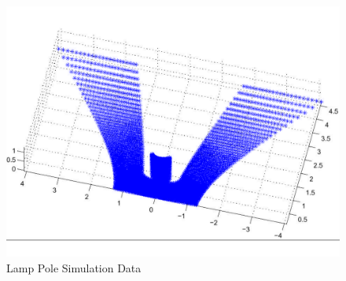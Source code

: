 \documentclass{cdcarta4}
\begin{document}
\begin{figure}[!htb]
    \centering
    \begin{minipage}[t]{0.4\textwidth}
       \centering\includegraphics[width=\textwidth]{img/PoleFit}
       \caption{Lamp Pole Simulation Data} \label{fig:polefit}
    \end{minipage}
\end{figure}
\end{document}
